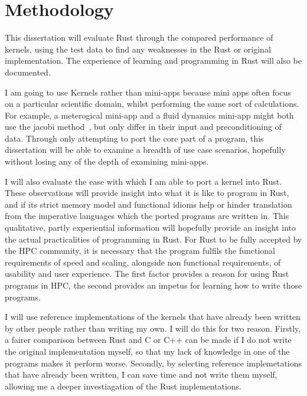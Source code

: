\chapter{Methodology}\label{sec:meth}
This dissertation will evaluate Rust through the compared performance of  kernels, using the test data to find any weaknesses in the Rust or original implementation. The experience of learning and programming in Rust will also be documented.

I am going to use Kernels rather than mini-apps because mini apps often focus on a particular scientific domain, whilst performing the same sort of calculations. For example, a meterogical mini-app and a fluid dynamics mini-app might both use the jacobi method~\cite{muller2014, schippers1982}, but only differ in their input and preconditioning of data.
Through only attempting to port the core part of a program, this dissertation will be able to examine a breadth of use case scenarios, hopefully without losing any of the depth of examining mini-apps.

I will also evaluate the ease with which I am able to port a kernel into Rust. These observations will provide insight into what it is like to program in Rust, and if its strict memory model and functional idioms help or hinder translation from the imperative languages which the ported programs are written in. This qualitative, partly experiential information will hopefully provide an insight into the actual practicalities of programming in Rust. For Rust to be fully accepted by the HPC community, it is necessary that the program fulfils the functional requirements of speed and scaling, alongside non functional requirements, of usability and user experience. The first factor provides a reason for using Rust programs in HPC, the second provides an impetus for learning how to write those programs.

I will use reference implementations of the kernels that have already been written by other people rather than writing my own. I will do this for two reason. Firstly, a fairer comparison between Rust and C or C++ can be made if I do not write the original implementation myself, so that my lack of knowledge in one of the programs makes it perform worse. Secondly, by selecting reference implemetations that have already been written, I can save time and not write them myself, allowing me a deeper investiagation of the Rust implementations.

